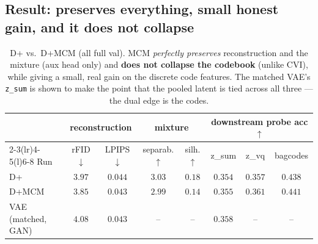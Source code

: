 \documentclass[11pt]{article}
\newcommand{\good}[1]{\textcolor{green!55!black}{#1}}
\begin{document}
\subsection*{Result: preserves everything, small honest gain, and it does not collapse}
\begin{table}[h]
\centering
\caption{D+ vs.\ D+MCM (all full val). MCM \emph{perfectly preserves} reconstruction and the mixture
(aux head only) and \textbf{does not collapse the codebook} (unlike CVI), while giving a small, real
gain on the discrete code features. The matched VAE's \texttt{z\_sum} is shown to make the point that
the pooled latent is tied across all three --- the dual edge is the codes.}
\label{tab:mcm}
\small
\begin{tabular}{lcc@{\hskip 1.2em}cc@{\hskip 1.2em}ccc}
\toprule
 & \multicolumn{2}{c}{reconstruction} & \multicolumn{2}{c}{mixture} & \multicolumn{3}{c}{downstream probe acc$\uparrow$}\\
\cmidrule(r){2-3}\cmidrule(lr){4-5}\cmidrule(l){6-8}
Run & rFID$\downarrow$ & LPIPS$\downarrow$ & separab.$\uparrow$ & silh.$\uparrow$ & z\_sum & z\_vq & bagcodes\\
\midrule
D+     & $3.97$ & $0.044$ & $3.03$ & $0.18$ & $0.354$ & $0.357$ & $0.438$\\
D+MCM  & \good{$3.85$} & \good{$0.043$} & \good{$2.99$} & $0.14$ & $0.355$ & \good{$0.361$} & \good{$0.441$}\\
\midrule
VAE (matched, GAN) & $4.08$ & $0.043$ & -- & -- & $0.358$ & -- & --\\
\bottomrule
\end{tabular}
\end{table}
\end{document}
